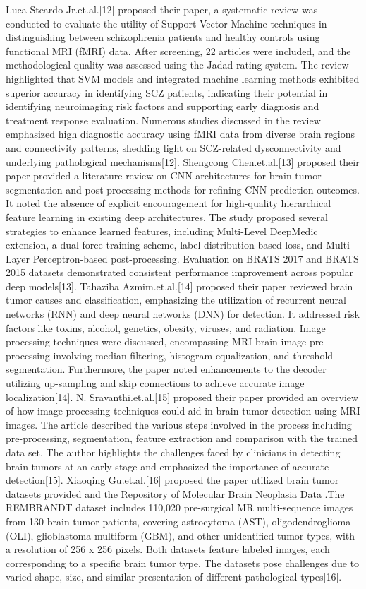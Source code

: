 \vspace{5mm} \newline
Luca Steardo Jr.et.al.[12] proposed their paper, a systematic review was conducted to evaluate the utility of Support Vector Machine techniques in distinguishing between schizophrenia patients and healthy controls using functional MRI (fMRI) data. After screening, 22 articles were included, and the methodological quality was assessed using the Jadad rating system. The review highlighted that SVM models and integrated machine learning methods exhibited superior accuracy in identifying SCZ patients, indicating their potential in identifying neuroimaging risk factors and supporting early diagnosis and treatment response evaluation. Numerous studies discussed in the review emphasized high diagnostic accuracy using fMRI data from diverse brain regions and connectivity patterns, shedding light on SCZ-related dysconnectivity and underlying pathological mechanisms[12]. Shengcong Chen.et.al.[13] proposed their paper provided a literature review on CNN architectures for brain tumor segmentation and post-processing methods for refining CNN prediction outcomes. It noted the absence of explicit encouragement for high-quality hierarchical feature learning in existing deep architectures. The study proposed several strategies to enhance learned features, including Multi-Level DeepMedic extension, a dual-force training scheme, label distribution-based loss, and Multi-Layer Perceptron-based post-processing. Evaluation on BRATS 2017 and BRATS 2015 datasets demonstrated consistent performance improvement across popular deep models[13]. Tahaziba Azmim.et.al.[14] proposed their paper reviewed brain tumor causes and classification, emphasizing the utilization of recurrent neural networks (RNN) and deep neural networks (DNN) for detection. It addressed risk factors like toxins, alcohol, genetics, obesity, viruses, and radiation. Image processing techniques were discussed, encompassing MRI brain image pre-processing involving median filtering, histogram equalization, and threshold segmentation. Furthermore, the paper noted enhancements to the decoder utilizing up-sampling and skip connections to achieve accurate image localization[14]. N. Sravanthi.et.al.[15] proposed their paper provided an overview of how image processing techniques could aid in brain tumor detection using MRI images. The article described the various steps involved in the process including pre-processing, segmentation, feature extraction and comparison with the trained data set. The author highlights the challenges faced by clinicians in detecting brain tumors at an early stage and emphasized the importance of accurate detection[15]. Xiaoqing Gu.et.al.[16] proposed the paper utilized brain tumor datasets provided  and the Repository of Molecular Brain Neoplasia Data .The REMBRANDT dataset includes 110,020 pre-surgical MR multi-sequence images from 130 brain tumor patients, covering astrocytoma (AST), oligodendroglioma (OLI), glioblastoma multiform (GBM), and other unidentified tumor types, with a resolution of 256 x 256 pixels. Both datasets feature labeled images, each corresponding to a specific brain tumor type. The datasets pose challenges due to varied shape, size, and similar presentation of different pathological types[16].
